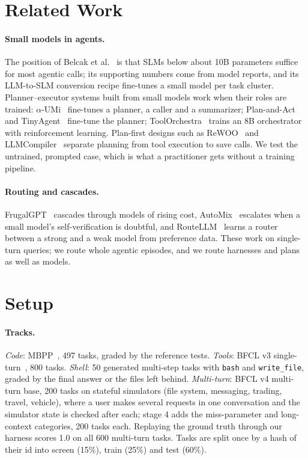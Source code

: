 \section{Related Work}

\paragraph{Small models in agents.} The position of Belcak et al.~\cite{belcak2025slm} is that SLMs below about 10B
parameters suffice for most agentic calls; its supporting numbers come from model reports, and its LLM-to-SLM
conversion recipe fine-tunes a small model per task cluster. Planner--executor systems built from small models
work when their roles are trained: $\alpha$-UMi~\cite{shen2024alphaumi} fine-tunes a planner, a caller and a summarizer;
Plan-and-Act~\cite{erdogan2025planact} and TinyAgent~\cite{erdogan2024tinyagent} fine-tune the planner;
ToolOrchestra~\cite{toolorchestra2025} trains an 8B orchestrator with reinforcement learning. Plan-first designs such
as ReWOO~\cite{xu2023rewoo} and LLMCompiler~\cite{kim2024llmcompiler} separate planning from tool execution to save
calls. We test the untrained, prompted case, which is what a practitioner gets without a training pipeline.

\paragraph{Routing and cascades.} FrugalGPT~\cite{chen2023frugalgpt} cascades through models of rising cost,
AutoMix~\cite{aggarwal2024automix} escalates when a small model's self-verification is doubtful, and
RouteLLM~\cite{ong2025routellm} learns a router between a strong and a weak model from preference data. These work
on single-turn queries; we route whole agentic episodes, and we route harnesses and plans as well as models.

\section{Setup}\label{sec:setup}

\paragraph{Tracks.} \emph{Code}: MBPP~\cite{austin2021mbpp}, 497 tasks, graded by the reference tests.
\emph{Tools}: BFCL v3 single-turn~\cite{patil2025bfcl}, 800 tasks. \emph{Shell}: 50 generated multi-step tasks
with \texttt{bash} and \texttt{write\_file}, graded by the final answer or the files left behind. \emph{Multi-turn}: BFCL v4 multi-turn base, 200 tasks on stateful simulators (file system,
messaging, trading, travel, vehicle), where a user makes several requests in one conversation and the simulator state
is checked after each; stage 4 adds the miss-parameter and long-context categories, 200 tasks each. Replaying the
ground truth through our harness scores 1.0 on all 600 multi-turn tasks. Tasks are split once by a hash of their id
into screen (15\%), train (25\%) and test (60\%).

